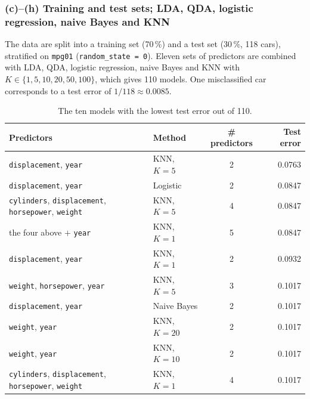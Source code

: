 \documentclass[11pt]{article}
\begin{document}
\subsubsection*{(c)--(h) Training and test sets; LDA, QDA, logistic regression, naive Bayes and KNN}
The data are split into a training set (70\,\%) and a test set (30\,\%, 118 cars), stratified on \texttt{mpg01} (\texttt{random\_state = 0}). Eleven sets of predictors are combined with LDA, QDA, logistic regression, naive Bayes and KNN with $K \in \{1, 5, 10, 20, 50, 100\}$, which gives 110 models. One misclassified car corresponds to a test error of $1/118 \approx 0.0085$.

\begin{table}[H]
  \centering
  \begin{tabular}{llcr}
    \toprule
    Predictors & Method & \# predictors & Test error \\
    \midrule
    \texttt{displacement}, \texttt{year} & KNN, $K = 5$ & 2 & 0.0763 \\
    \texttt{displacement}, \texttt{year} & Logistic & 2 & 0.0847 \\
    \texttt{cylinders}, \texttt{displacement}, \texttt{horsepower}, \texttt{weight} & KNN, $K = 5$ & 4 & 0.0847 \\
    the four above $+$ \texttt{year} & KNN, $K = 1$ & 5 & 0.0847 \\
    \texttt{displacement}, \texttt{year} & KNN, $K = 1$ & 2 & 0.0932 \\
    \texttt{weight}, \texttt{horsepower}, \texttt{year} & KNN, $K = 5$ & 3 & 0.1017 \\
    \texttt{displacement}, \texttt{year} & Naive Bayes & 2 & 0.1017 \\
    \texttt{weight}, \texttt{year} & KNN, $K = 20$ & 2 & 0.1017 \\
    \texttt{weight}, \texttt{year} & KNN, $K = 10$ & 2 & 0.1017 \\
    \texttt{cylinders}, \texttt{displacement}, \texttt{horsepower}, \texttt{weight} & KNN, $K = 1$ & 4 & 0.1017 \\
    \bottomrule
  \end{tabular}
  \caption{The ten models with the lowest test error out of 110.}
\end{table}
\end{document}
